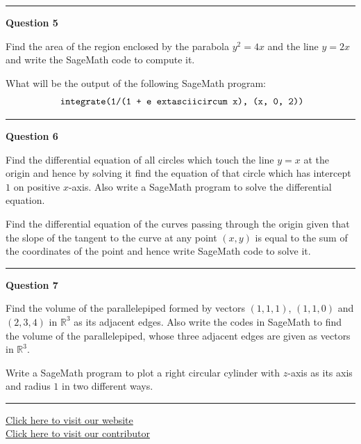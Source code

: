 \documentclass[11pt,a4paper]{article}
\begin{document}
\medskip\rule{\linewidth}{0.2pt}\medskip




\noindent   \textbf{Question 5}

\begin{parts}
  \item Find the area of the region enclosed by the parabola $y^2 = 4x$ and the line $y = 2x$ and write the SageMath code to compute it.
  \item What will be the output of the following SageMath program:
  \[
   \text{   \texttt{integrate(1/(1 + e extasciicircum x), (x, 0, 2))}}
  \]
\end{parts}

\medskip\rule{\linewidth}{0.2pt}\medskip




\noindent   \textbf{Question 6}

\begin{parts}
  \item Find the differential equation of all circles which touch the line $y = x$ at the origin and hence by solving it find the equation of that circle which has intercept $1$ on positive $x$-axis. Also write a SageMath program to solve the differential equation.
  \item Find the differential equation of the curves passing through the origin given that the slope of the tangent to the curve at any point $(x,y)$ is equal to the sum of the coordinates of the point and hence write SageMath code to solve it.
\end{parts}

\medskip\rule{\linewidth}{0.2pt}\medskip




\noindent   \textbf{Question 7}

\begin{parts}
  \item Find the volume of the parallelepiped formed by vectors $(1,1,1)$, $(1,1,0)$ and $(2,3,4)$ in $\mathbb{R}^3$ as its adjacent edges. Also write the codes in SageMath to find the volume of the parallelepiped, whose three adjacent edges are given as vectors in $\mathbb{R}^3$.
  \item Write a SageMath program to plot a right circular cylinder with $z$-axis as its axis and radius $1$ in two different ways.
\end{parts}

\vfill\rule{\linewidth}{0.4pt}

\begin{center}\small
\href{https://bhu-exam.vercel.app/}{Click here to visit our website}\\[4pt]
\href{https://me-aryan.vercel.app/}{Click here to visit our contributor}
\end{center}
\end{document}

